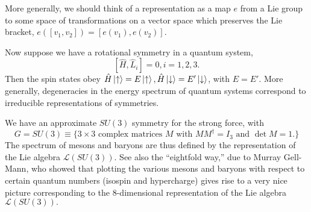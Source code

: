 More generally, we should think of a representation as a map $e$ from a Lie group to some space of transformations on a vector space which preserves the Lie bracket, $e([v_1,v_2])=[e(v_1),e(v_2)]$.

Now suppose we have a rotational symmetry in a quantum system, $$[\hat H, \hat L_i]=0,i=1,2,3.$$ Then the spin states obey $\hat H\left| \uparrow \right>=E\left| \uparrow \right>, \hat H\left| \downarrow \right>= E' \left| \downarrow \right>$, with $E=E'$. More generally, degeneracies in the energy spectrum of quantum systems correspond to irreducible representations of symmetries.

\begin{exm}
We have an approximate $SU(3)$ symmetry for the strong force, with
$$G=SU(3)\equiv \{3\times 3 \text{ complex matrices } M \text{ with } M M^\dagger = I_3 \text{ and } \det M = 1.\}$$
The spectrum of mesons and baryons are thus defined by the representation of the Lie algebra $\mathcal{L}(SU(3))$. See also the ``eightfold way,'' due to Murray Gell-Mann, who showed that plotting the various mesons and baryons with respect to certain quantum numbers (isospin and hypercharge) gives rise to a very nice picture corresponding to the 8-dimensional representation of the Lie algebra $\mathcal{L}(SU(3)).$ %
\end{exm}